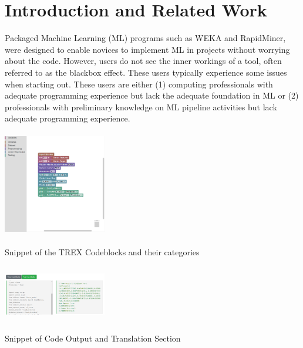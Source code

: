 \documentclass{sigchi-ext}
\begin{document}
\printccsdesc

\section{Introduction and Related Work}
Packaged Machine Learning (ML) programs such as WEKA and RapidMiner, were designed to enable novices to implement ML in projects without worrying about the code. However, users do not see the inner workings of a tool, often referred to as the blackbox effect. These users typically experience some issues when starting out. These users are either (1) computing professionals with adequate programming experience but lack the adequate foundation in ML or (2) professionals with preliminary knowledge on ML pipeline activities but lack adequate programming experience.

\begin{marginfigure}[-15pc]
\begin{minipage}{\marginparwidth}
     \centering
    \includegraphics[width=4.5cm,height=4.65cm]{sigchi-latex-extended-abstracts/figures/codeblocks_categories.png}
    \caption{Snippet of the TREX Codeblocks and their categories}
    \label{fig:Code_cat}
    \end{minipage}
\end{marginfigure}

\begin{marginfigure}[1.5pc]
\begin{minipage}{\marginparwidth}
     \centering
    \includegraphics[width=4.5cm,height=2.5cm]{figures/Code_Output.png}
    \caption{Snippet of Code Output and Translation Section}
    \label{fig:Code_output}
    \end{minipage}
\end{marginfigure}
\end{document}
